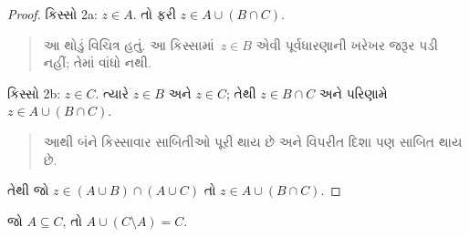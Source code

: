 \begin{proof}
કિસ્સો 2a: $z \in A$. તો ફરી $z \in A \cup (B \cap C)$.
\begin{quote}
આ થોડું વિચિત્ર હતું. આ કિસ્સામાં~$z \in B$ એવી
પૂર્વધારણાની ખરેખર જરૂર પડી નહીં; તેમાં વાંધો નથી.
\end{quote}
કિસ્સો 2b: $z \in C$. ત્યારે $z \in B$ અને $z \in C$;
તેથી $z \in B \cap C$ અને પરિણામે $z \in A \cup (B \cap C)$.
\begin{quote}
આથી બંને કિસ્સાવાર સાબિતીઓ પૂરી થાય છે અને વિપરીત દિશા
પણ સાબિત થાય છે.
\end{quote}
તેથી જો $z \in (A \cup B) \cap (A \cup C)$ તો $z \in A \cup (B \cap C)$.
\end{proof}
\endgroup


\begingroup
\makeatletter{}\makeatother


\label{guunit:OLP-0608}


\begin{prop}
જો $A \subseteq C$, તો $A \cup (C \setminus A) = C$.
\end{prop}

